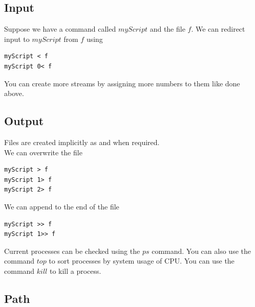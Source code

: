 \documentclass[a4paper]{article}
\theoremstyle{plain}
\theoremstyle{definition}
\theoremstyle{remark}
\begin{document}
\subsection{Input}
Suppose we have a command called $myScript$ and the file $f$. We can redirect input to $myScript$ from $f$ using
\begin{lstlisting}[language = Shell]
myScript < f
myScript 0< f
\end{lstlisting}
You can create more streams by assigning more numbers to them like done above.
\subsection{Output}
Files are created implicitly as and when required.\\
We can overwrite the file
\begin{lstlisting}[language = Shell]
myScript > f
myScript 1> f
myScript 2> f
\end{lstlisting}
We can append to the end of the file
\begin{lstlisting}[language = Shell]
myScript >> f
myScript 1>> f
\end{lstlisting}
Current processes can be checked using the $ps$ command. You can also use the command $top$ to sort processes by system usage of CPU. You can use the command $kill$ to kill a process.
\subsection{Path}
\end{document}
